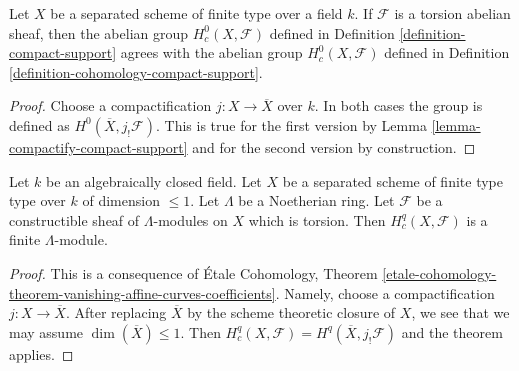 \begin{lemma}
\label{lemma-compact-support-h0}
Let $X$ be a separated scheme of finite type over a field $k$.
If $\mathcal{F}$ is a torsion abelian sheaf, then the abelian group
$H^0_c(X, \mathcal{F})$ defined in Definition \ref{definition-compact-support}
agrees with the abelian group $H^0_c(X, \mathcal{F})$ defined in
Definition \ref{definition-cohomology-compact-support}.
\end{lemma}

\begin{proof}
Choose a compactification $j : X \to \overline{X}$ over $k$.
In both cases the group is defined as $H^0(\overline{X}, j_!\mathcal{F})$.
This is true for the first version by
Lemma \ref{lemma-compactify-compact-support}
and for the second version by construction.
\end{proof}

\begin{lemma}
\label{lemma-finiteness-curves}
Let $k$ be an algebraically closed field. Let $X$ be a separated
scheme of finite type type over $k$ of dimension $\leq 1$.
Let $\Lambda$ be a Noetherian ring.
Let $\mathcal{F}$ be a constructible sheaf of $\Lambda$-modules
on $X$ which is torsion. Then $H^q_c(X, \mathcal{F})$ is a
finite $\Lambda$-module.
\end{lemma}

\begin{proof}
This is a consequence of \'Etale Cohomology, Theorem
\ref{etale-cohomology-theorem-vanishing-affine-curves-coefficients}.
Namely, choose a compactification $j : X \to \overline{X}$.
After replacing $\overline{X}$ by the scheme theoretic closure
of $X$, we see that we may assume $\dim(\overline{X}) \leq 1$.
Then $H^q_c(X, \mathcal{F}) = H^q(\overline{X}, j_!\mathcal{F})$
and the theorem applies.
\end{proof}

